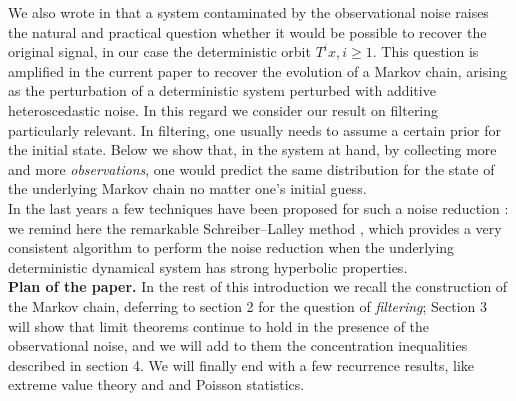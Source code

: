 \documentclass{article}
\newcommand{\1}{\mathbbm{1}}
\begin{document}
We also wrote in \cite {FV} that  a system contaminated by the observational noise raises
the natural and practical question whether it would be possible
to recover the original signal, in our case the deterministic orbit $T^ix, i\ge 1.$ This question is amplified in the current paper to recover the evolution of a Markov chain, arising as the perturbation of a deterministic system perturbed with additive heteroscedastic noise. In this regard we consider our result on filtering particularly relevant. In filtering, one usually needs to assume a certain prior for the initial state. Below we show that, in the system at hand, by collecting more and more {\em observations}, one would predict the
same distribution for the state of the underlying Markov chain no matter one’s initial guess.\\

In the last years a few techniques have been proposed
for such a noise reduction \cite{sei}: we remind here the remarkable
Schreiber–Lalley method \cite{sette,otto,nove,dieci}, which provides a very consistent
algorithm to perform the noise reduction when the underlying
deterministic dynamical system has strong hyperbolic properties.\\


{\bf Plan of the paper.} In the rest of this introduction we recall the construction of the Markov chain, deferring to section 2 for the question of {\em filtering};  Section 3 will show that limit theorems continue to hold in the presence of the observational noise, and we will add to them the concentration inequalities described in section 4. We will finally end with a few recurrence results, like extreme value theory and   and Poisson statistics. 
\end{document}
